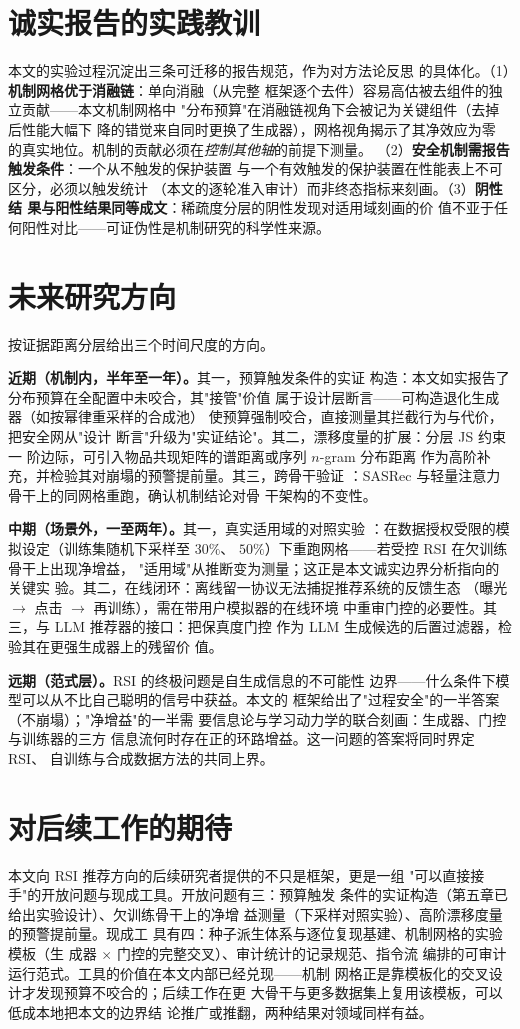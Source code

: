 \section*{诚实报告的实践教训}
本文的实验过程沉淀出三条可迁移的报告规范，作为对方法论反思
的具体化。（1）\textbf{机制网格优于消融链}：单向消融（从完整
框架逐个去件）容易高估被去组件的独立贡献——本文机制网格中
"分布预算"在消融链视角下会被记为关键组件（去掉后性能大幅下
降的错觉来自同时更换了生成器），网格视角揭示了其净效应为零
的真实地位。机制的贡献必须在\emph{控制其他轴}的前提下测量。
（2）\textbf{安全机制需报告触发条件}：一个从不触发的保护装置
与一个有效触发的保护装置在性能表上不可区分，必须以触发统计
（本文的逐轮准入审计）而非终态指标来刻画。（3）\textbf{阴性结
果与阳性结果同等成文}：稀疏度分层的阴性发现对适用域刻画的价
值不亚于任何阳性对比——可证伪性是机制研究的科学性来源。

\section{未来研究方向}
按证据距离分层给出三个时间尺度的方向。

\textbf{近期（机制内，半年至一年）。}其一，预算触发条件的实证
构造：本文如实报告了分布预算在全配置中未咬合，其"接管"价值
属于设计层断言——可构造退化生成器（如按幂律重采样的合成池）
使预算强制咬合，直接测量其拦截行为与代价，把安全网从"设计
断言"升级为"实证结论"。其二，漂移度量的扩展：分层 JS 约束一
阶边际，可引入物品共现矩阵的谱距离或序列 $n$-gram 分布距离
作为高阶补充，并检验其对崩塌的预警提前量。其三，跨骨干验证
：SASRec 与轻量注意力骨干上的同网格重跑，确认机制结论对骨
干架构的不变性。

\textbf{中期（场景外，一至两年）。}其一，真实适用域的对照实验
：在数据授权受限的模拟设定（训练集随机下采样至 $30\%$、
$50\%$）下重跑网格——若受控 RSI 在欠训练骨干上出现净增益，
"适用域"从推断变为测量；这正是本文诚实边界分析指向的关键实
验。其二，在线闭环：离线留一协议无法捕捉推荐系统的反馈生态
（曝光 $\to$ 点击 $\to$ 再训练），需在带用户模拟器的在线环境
中重审门控的必要性。其三，与 LLM 推荐器的接口：把保真度门控
作为 LLM 生成候选的后置过滤器，检验其在更强生成器上的残留价
值。

\textbf{远期（范式层）。}RSI 的终极问题是自生成信息的不可能性
边界——什么条件下模型可以从不比自己聪明的信号中获益。本文的
框架给出了"过程安全"的一半答案（不崩塌）；"净增益"的一半需
要信息论与学习动力学的联合刻画：生成器、门控与训练器的三方
信息流何时存在正的环路增益。这一问题的答案将同时界定 RSI、
自训练与合成数据方法的共同上界。

\section*{对后续工作的期待}
本文向 RSI 推荐方向的后续研究者提供的不只是框架，更是一组
"可以直接接手"的开放问题与现成工具。开放问题有三：预算触发
条件的实证构造（第五章已给出实验设计）、欠训练骨干上的净增
益测量（下采样对照实验）、高阶漂移度量的预警提前量。现成工
具有四：种子派生体系与逐位复现基建、机制网格的实验模板（生
成器 $\times$ 门控的完整交叉）、审计统计的记录规范、指令流
编排的可审计运行范式。工具的价值在本文内部已经兑现——机制
网格正是靠模板化的交叉设计才发现预算不咬合的；后续工作在更
大骨干与更多数据集上复用该模板，可以低成本地把本文的边界结
论推广或推翻，两种结果对领域同样有益。

